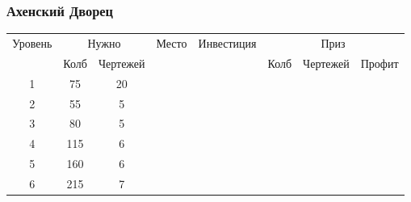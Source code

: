 \subsubsection{Ахенский Дворец}

\begin{longtable}[c]{|c|c|c|c|c|c|c|c|}
    \hline
    \multirow{ 2}{*}{\small Уровень} &
    \multicolumn{2}{|c|}{\small Нужно} &
    \multirow{ 2}{*}{\small Место} & 
    \multirow{ 2}{*}{\small Инвестиция} & 
    \multicolumn{3}{|c|}{\small Приз} \\\cline{2-3}\cline{6-8}
    &
    {\small Колб} & 
    {\small Чертежей} & 
    & &
    {\small Колб} & 
    {\small Чертежей} & 
    {\small Профит}
    \\\hline\endhead
    \multirow{1}{*}{1} & \multirow{1}{*}{75} & \multirow{1}{*}{20} & & & & & \\\hline
    \multirow{1}{*}{2} & \multirow{1}{*}{55} & \multirow{1}{*}{5} & & & & & \\\hline
    \multirow{1}{*}{3} & \multirow{1}{*}{80} & \multirow{1}{*}{5} & & & & & \\\hline
    \multirow{1}{*}{4} & \multirow{1}{*}{115} & \multirow{1}{*}{6} & & & & & \\\hline
    \multirow{1}{*}{5} & \multirow{1}{*}{160} & \multirow{1}{*}{6} & & & & & \\\hline
    \multirow{1}{*}{6} & \multirow{1}{*}{215} & \multirow{1}{*}{7} & & & & & \\\hline
\end{longtable}
